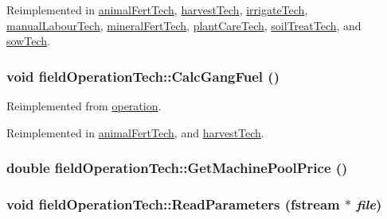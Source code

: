 Reimplemented in \hyperlink{classanimal_fert_tech_ab2e8f130cf259ed4c7669e92ff1bfebe}{animalFertTech}, \hyperlink{classharvest_tech_a9cbac27e3242c6ac08e0cbcebfdb13b3}{harvestTech}, \hyperlink{classirrigate_tech_a68212d5382845e1cf877f0c2b1ab1019}{irrigateTech}, \hyperlink{classmanual_labour_tech_a672922b49eac69b5ebf765e66bdcb3ef}{manualLabourTech}, \hyperlink{classmineral_fert_tech_a0b0d6226496238a9c11637a3c70429ee}{mineralFertTech}, \hyperlink{classplant_care_tech_aafaa089fe218f4a9edb91842404160e5}{plantCareTech}, \hyperlink{classsoil_treat_tech_a988dd9310b22be5d36a28cdaa1dcc805}{soilTreatTech}, and \hyperlink{classsow_tech_a044008a71f40c31f0bd3469476c70e97}{sowTech}.\hypertarget{classfield_operation_tech_a530d49b4cf06668121b80eba679b7e98}{
\subsubsection[{CalcGangFuel}]{\setlength{\rightskip}{0pt plus 5cm}void fieldOperationTech::CalcGangFuel ()}}
\label{classfield_operation_tech_a530d49b4cf06668121b80eba679b7e98}


Reimplemented from \hyperlink{classoperation_ab311cc421c3cc2a37dee5f2fc4e4c296}{operation}.

Reimplemented in \hyperlink{classanimal_fert_tech_a3847a22b473b9a09f5e524c165ae0484}{animalFertTech}, and \hyperlink{classharvest_tech_a7da76cf91a1af094816d27b373e7f913}{harvestTech}.\hypertarget{classfield_operation_tech_a8d61005df70d41e8c1ddcdcf418ee65e}{
\subsubsection[{GetMachinePoolPrice}]{\setlength{\rightskip}{0pt plus 5cm}double fieldOperationTech::GetMachinePoolPrice ()}}
\label{classfield_operation_tech_a8d61005df70d41e8c1ddcdcf418ee65e}
\hypertarget{classfield_operation_tech_a2a2c416f3f3fe8ceb2f1f1b63c149a09}{
\subsubsection[{ReadParameters}]{\setlength{\rightskip}{0pt plus 5cm}void fieldOperationTech::ReadParameters (fstream $\ast$ {\em file})}}
\label{classfield_operation_tech_a2a2c416f3f3fe8ceb2f1f1b63c149a09}


